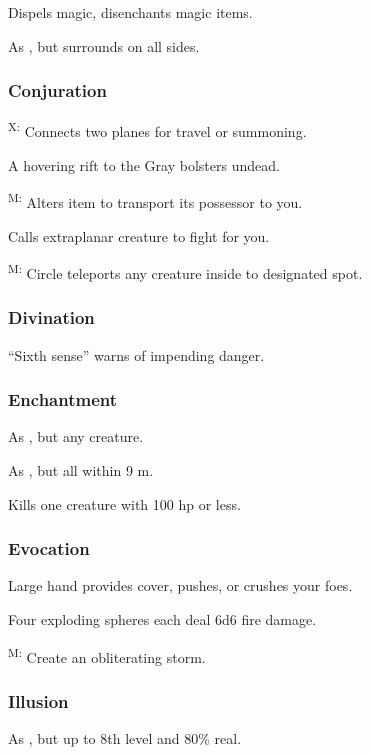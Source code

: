 	 Dispels magic, disenchants magic items.

	 As , but surrounds on all sides.

\subsubsection{Conjuration}
	\textsuperscript{X:} Connects two planes for travel or summoning.

	 A hovering rift to the Gray bolsters undead. %

	\textsuperscript{M:} Alters item to transport its possessor to you.

	 Calls extraplanar creature to fight for you.

	\textsuperscript{M:} Circle teleports any creature inside to designated spot.

\subsubsection{Divination}
	 ``Sixth sense'' warns of impending danger.

\subsubsection{Enchantment}
	 As , but any creature.

	 As , but all within 9 m.

	 Kills one creature with 100 hp or less.

\subsubsection{Evocation}
	 Large hand provides cover, pushes, or crushes your foes.

	 Four exploding spheres each deal 6d6 fire damage.

	\textsuperscript{M:} Create an obliterating storm. %

\subsubsection{Illusion}
	 As , but up to 8th level and 80\% real.

